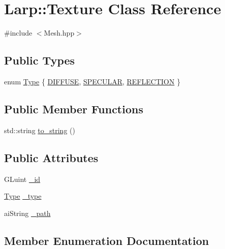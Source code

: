 \hypertarget{classLarp_1_1Texture}{}\section{Larp\+:\+:Texture Class Reference}
\label{classLarp_1_1Texture}


{\ttfamily \#include $<$Mesh.\+hpp$>$}

\subsection*{Public Types}
\begin{DoxyCompactItemize}
\item 
enum \hyperlink{classLarp_1_1Texture_aa4e19b5df6a8f1f0eae8235db7e52daa}{Type} \{ \hyperlink{classLarp_1_1Texture_aa4e19b5df6a8f1f0eae8235db7e52daaa99b3b29878c69b4fc932de604ce39581}{D\+I\+F\+F\+U\+SE}, 
\hyperlink{classLarp_1_1Texture_aa4e19b5df6a8f1f0eae8235db7e52daaa5d8421e01e03aeb7f2911890a0a138b4}{S\+P\+E\+C\+U\+L\+AR}, 
\hyperlink{classLarp_1_1Texture_aa4e19b5df6a8f1f0eae8235db7e52daaa6b6cb64a97445fc87ac1b9c8f43696e2}{R\+E\+F\+L\+E\+C\+T\+I\+ON}
 \}
\end{DoxyCompactItemize}
\subsection*{Public Member Functions}
\begin{DoxyCompactItemize}
\item 
std\+::string \hyperlink{classLarp_1_1Texture_aa5ab3d71dc56dafc3e4620bfaf4e619b}{to\+\_\+string} ()
\end{DoxyCompactItemize}
\subsection*{Public Attributes}
\begin{DoxyCompactItemize}
\item 
G\+Luint \hyperlink{classLarp_1_1Texture_a123213a957b3d3ca92ea5439c12a1097}{\+\_\+id}
\item 
\hyperlink{classLarp_1_1Texture_aa4e19b5df6a8f1f0eae8235db7e52daa}{Type} \hyperlink{classLarp_1_1Texture_a5db004a6f9355d7c055bbf036b5bc2f4}{\+\_\+type}
\item 
ai\+String \hyperlink{classLarp_1_1Texture_aed77d19ec08af05131aa054df2f937b9}{\+\_\+path}
\end{DoxyCompactItemize}


\subsection{Member Enumeration Documentation}
